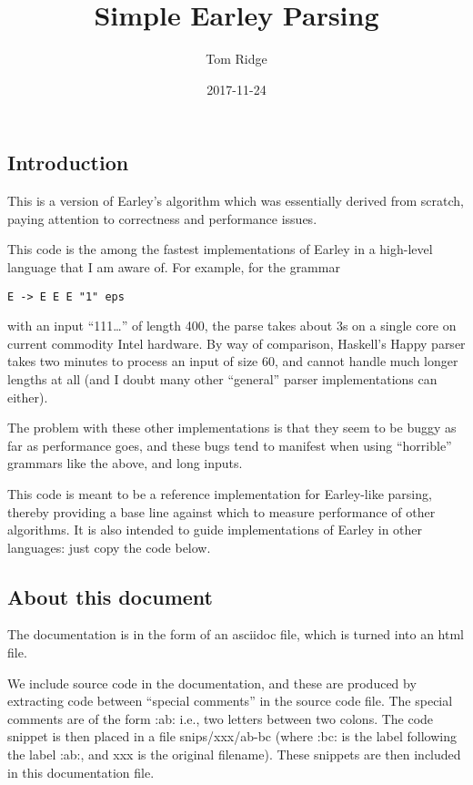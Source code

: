 \documentclass[]{article}
\title{Simple Earley Parsing}
\author{Tom Ridge}
\date{2017-11-24}
\begin{document}
\maketitle



\pagestyle{empty}
\setlength\columnsep{2cm} %
\begin{multicols}{2}

\section{Introduction}

This is a version of Earley's algorithm which was essentially derived
from scratch, paying attention to correctness and performance issues.

This code is the among the fastest implementations of Earley in a
high-level language that I am aware of. For example, for the grammar

\texttt{E -\textgreater{} E E E \textbar{} "1" \textbar{} eps}

with an input ``111\ldots{}'' of length 400, the parse takes about 3s on
a single core on current commodity Intel hardware. By way of comparison,
Haskell's Happy parser takes two minutes to process an input of size 60,
and cannot handle much longer lengths at all (and I doubt many other
``general'' parser implementations can either).

The problem with these other implementations is that they seem to be
buggy as far as performance goes, and these bugs tend to manifest when
using ``horrible'' grammars like the above, and long inputs.

This code is meant to be a reference implementation for Earley-like
parsing, thereby providing a base line against which to measure
performance of other algorithms. It is also intended to guide
implementations of Earley in other languages: just copy the code below.

\subsection{About this document}

The documentation is in the form of an asciidoc file, which is turned
into an html file.

We include source code in the documentation, and these are produced by
extracting code between ``special comments'' in the source code file.
The special comments are of the form :ab: i.e., two letters between two
colons. The code snippet is then placed in a file snips/xxx/ab-bc (where
:bc: is the label following the label :ab:, and xxx is the original
filename). These snippets are then included in this documentation file.


\end{multicols}
\end{document}
